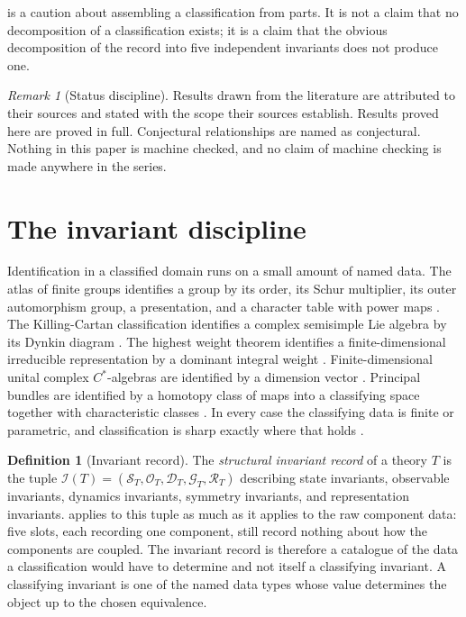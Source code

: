 \documentclass[11pt,letterpaper]{article}
\theoremstyle{definition}
\newtheorem{definition}[theorem]{Definition}
\theoremstyle{remark}
\newtheorem{remark}[theorem]{Remark}
\begin{document}
 is a caution about assembling a classification from parts. It is not a claim that no decomposition of a classification exists; it is a claim that the obvious decomposition of the record into five independent invariants does not produce one.

\begin{remark}[Status discipline]
\label{rem:status}
Results drawn from the literature are attributed to their sources and stated with the scope their sources establish. Results proved here are proved in full. Conjectural relationships are named as conjectural. Nothing in this paper is machine checked, and no claim of machine checking is made anywhere in the series.
\end{remark}

\section{The invariant discipline}
\label{sec:discipline}

Identification in a classified domain runs on a small amount of named data. The atlas of finite groups identifies a group by its order, its Schur multiplier, its outer automorphism group, a presentation, and a character table with power maps \cite{atlas}. The Killing-Cartan classification identifies a complex semisimple Lie algebra by its Dynkin diagram \cite{lie}. The highest weight theorem identifies a finite-dimensional irreducible representation by a dominant integral weight \cite{hw}. Finite-dimensional unital complex $C^*$-algebras are identified by a dimension vector \cite{calg}. Principal bundles are identified by a homotopy class of maps into a classifying space together with characteristic classes \cite{classifying-space,charclass}. In every case the classifying data is finite or parametric, and classification is sharp exactly where that holds \cite{cfsg,lie,hw,darboux,calg,classifying-space}.

\begin{definition}[Invariant record]
\label{def:invariant-record}
The \emph{structural invariant record} of a theory $T$ is the tuple $\mathcal{I}(T) = (\mathcal{S}_T, \mathcal{O}_T, \mathcal{D}_T, \mathcal{G}_T, \mathcal{R}_T)$ describing state invariants, observable invariants, dynamics invariants, symmetry invariants, and representation invariants.  applies to this tuple as much as it applies to the raw component data: five slots, each recording one component, still record nothing about how the components are coupled. The invariant record is therefore a catalogue of the data a classification would have to determine and not itself a classifying invariant. A classifying invariant is one of the named data types whose value determines the object up to the chosen equivalence.
\end{definition}
\end{document}
